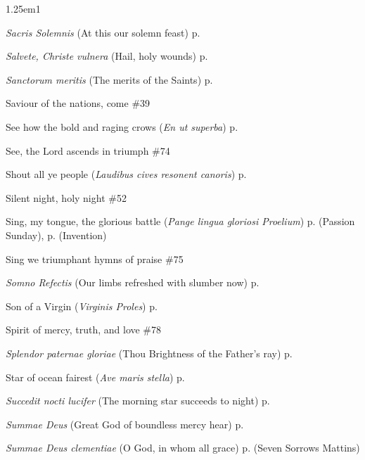 \begin{hangparas}{1.25em}{1}
\par\noindent
\textit{Sacris Solemnis} (At this our solemn feast) \dotfill p. \pageref{CorpusChristiInvitatory}
\par\noindent
\textit{Salvete, Christe vulnera} (Hail, holy wounds) \dotfill p. \pageref{PreciousBloodMattins}
\par\noindent
\textit{Sanctorum meritis} (The merits of the Saints) \dotfill p. \pageref{MartyrsEvensong}
\par\noindent
Saviour of the nations, come \dotfill \#39
\par\noindent
See how the bold and raging crows (\textit{En ut superba}) \dotfill p. \pageref{CompassionInvitatory}
\par\noindent
See, the Lord ascends in triumph \dotfill \#74
\par\noindent
Shout all ye people (\textit{Laudibus cives resonent canoris}) \dotfill p. \pageref{BenedictEvensong}
\par\noindent
Silent night, holy night \dotfill \#52
\par\noindent
Sing, my tongue, the glorious battle (\textit{Pange lingua gloriosi Proelium}) \dotfill p. \pageref{PassionInvitatoryHymn} (Passion Sunday), p. \pageref{InventionInvitatory} (Invention)
\par\noindent
Sing we triumphant hymns of praise \dotfill \#75
\par\noindent
\textit{Somno Refectis} (Our limbs refreshed with slumber now) \dotfill p. \pageref{MondayInvitatory}
\par\noindent
Son of a Virgin (\textit{Virginis Proles}) \dotfill p. \pageref{VirginInvitatory}
\par\noindent
Spirit of mercy, truth, and love \dotfill \#78
\par\noindent
\textit{Splendor paternae gloriae} (Thou Brightness of the Father's ray) \dotfill p. \pageref{MondayMattinsWinter}
\par\noindent
Star of ocean fairest (\textit{Ave maris stella}) \dotfill p. \pageref{BVMEvensong}
\par\noindent
\textit{Succedit nocti lucifer} (The morning star succeeds to night) \dotfill p. \pageref{AnneMattins}
\par\noindent
\textit{Summae Deus} (Great God of boundless mercy hear) \dotfill p. \pageref{SaturdayInvitatory}
\par\noindent
\textit{Summae Deus clementiae} (O God, in whom all grace) \dotfill p. \pageref{SevenSorrowsMattins} (Seven Sorrows Mattins)
\par\noindent

\end{hangparas}
